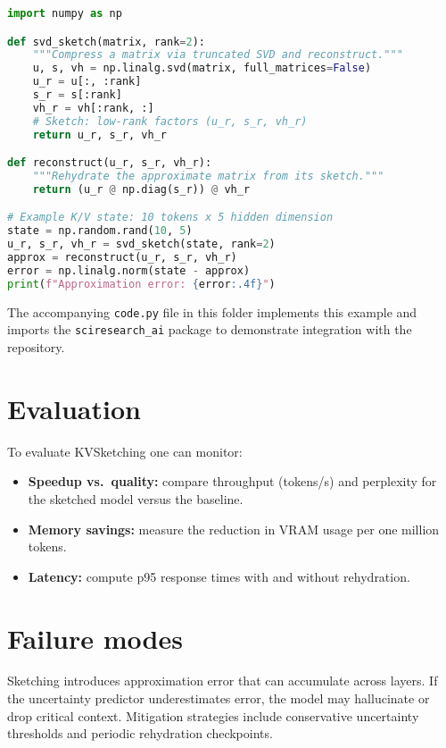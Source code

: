 \documentclass{article}
\begin{document}
\begin{lstlisting}[language=Python, caption={Simple KV\-sketching prototype using SVD.}, label={alg:kvsketch}]
import numpy as np

def svd_sketch(matrix, rank=2):
    """Compress a matrix via truncated SVD and reconstruct."""
    u, s, vh = np.linalg.svd(matrix, full_matrices=False)
    u_r = u[:, :rank]
    s_r = s[:rank]
    vh_r = vh[:rank, :]
    # Sketch: low-rank factors (u_r, s_r, vh_r)
    return u_r, s_r, vh_r

def reconstruct(u_r, s_r, vh_r):
    """Rehydrate the approximate matrix from its sketch."""
    return (u_r @ np.diag(s_r)) @ vh_r

# Example K/V state: 10 tokens x 5 hidden dimension
state = np.random.rand(10, 5)
u_r, s_r, vh_r = svd_sketch(state, rank=2)
approx = reconstruct(u_r, s_r, vh_r)
error = np.linalg.norm(state - approx)
print(f"Approximation error: {error:.4f}")
\end{lstlisting}

The accompanying \texttt{code.py} file in this folder implements this example and imports the \texttt{sciresearch\_ai} package to demonstrate integration with the repository.

\section{Evaluation}
To evaluate KV\-Sketching one can monitor:
\begin{itemize}
  \item \textbf{Speedup vs.\ quality:} compare throughput (tokens/s) and perplexity for the sketched model versus the baseline.
  \item \textbf{Memory savings:} measure the reduction in VRAM usage per one million tokens.
  \item \textbf{Latency:} compute p95 response times with and without rehydration.
\end{itemize}

\section{Failure modes}
Sketching introduces approximation error that can accumulate across layers.  If the uncertainty predictor underestimates error, the model may hallucinate or drop critical context.  Mitigation strategies include conservative uncertainty thresholds and periodic rehydration checkpoints.
\end{document}
